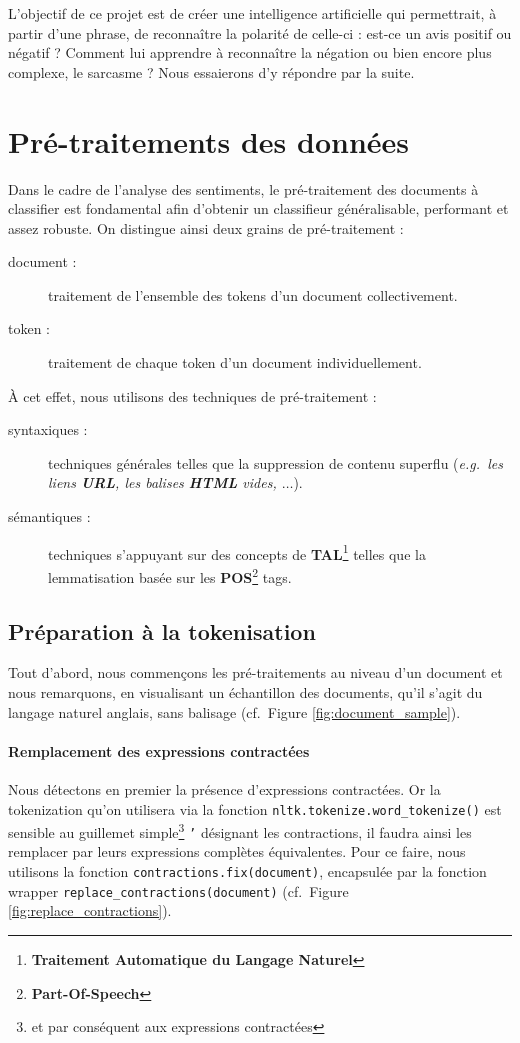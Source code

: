 \documentclass[12pt,a4paper]{report}
\theoremstyle{definition}
\begin{document}
L'objectif de ce projet est de créer une intelligence artificielle qui permettrait, à partir d'une phrase, de reconnaître la polarité de celle-ci : est-ce un avis positif ou négatif ? Comment lui apprendre à reconnaître la négation ou bien encore plus complexe, le sarcasme ? Nous essaierons d'y répondre par la suite.

\chapter{Pré-traitements des données}
Dans le cadre de l'analyse des sentiments, le pré-traitement des documents à classifier est fondamental afin d'obtenir un classifieur généralisable, performant et assez robuste. On distingue ainsi deux grains de pré-traitement :
\begin{description}
  \item [document :] traitement de l'ensemble des tokens d'un document collectivement.
  \item [token :] traitement de chaque token d'un document individuellement.
\end{description}

À cet effet, nous utilisons des techniques de pré-traitement :
\begin{description}
  \item [syntaxiques :] techniques générales telles que la suppression de contenu superflu (\emph{e.g.~les liens \textbf{URL}, les balises \textbf{HTML} vides, $\dots$}).
  \item [sémantiques :] techniques s'appuyant sur des concepts de \textbf{TAL}\footnote{\textbf{Traitement Automatique du Langage Naturel}} telles que la lemmatisation basée sur les \textbf{POS}\footnote{\textbf{Part-Of-Speech}} tags.
\end{description}

\section{Préparation à la tokenisation}
Tout d'abord, nous commençons les pré-traitements au niveau d'un document et nous remarquons, en visualisant un échantillon des documents, qu'il s'agit du langage naturel anglais, sans balisage (cf.~Figure \ref{fig:document_sample}).

\subsubsection{Remplacement des expressions contractées}
Nous détectons en premier la présence d'expressions contractées. Or la tokenization qu'on utilisera via la fonction \texttt{nltk.tokenize.word\_tokenize()} est sensible au guillemet simple\footnote{et par conséquent aux expressions contractées} \og \texttt{'} \fg désignant les contractions, il faudra ainsi les remplacer par leurs expressions complètes équivalentes. Pour ce faire, nous utilisons la fonction \texttt{contractions.fix(document)}, encapsulée par la fonction wrapper \texttt{replace\_contractions(document)} (cf.~Figure \ref{fig:replace_contractions}).
\end{document}
